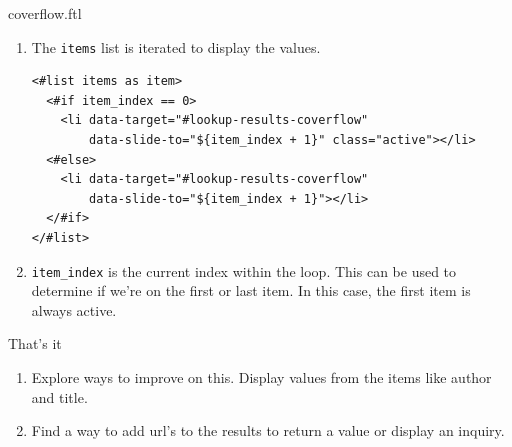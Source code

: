 \documentclass[xcolor=dvipsnames,14pt,professionalfonts]{beamer}
\begin{document}
 \begin{frame}[fragile]{coverflow.ftl}
  \begin{enumerate}
   \item The \texttt{items} list is iterated to display the values.
   \begin{verbatim}
<#list items as item>
  <#if item_index == 0>
    <li data-target="#lookup-results-coverflow" 
        data-slide-to="${item_index + 1}" class="active"></li>
  <#else>
    <li data-target="#lookup-results-coverflow" 
        data-slide-to="${item_index + 1}"></li>
  </#if>
</#list>
   \end{verbatim} 
   \item \texttt{item\_index} is the current index within the
     loop. This can be used to determine if we're on the first or last
     item. In this case, the first item is always active.
 \end{enumerate}
\end{frame}

\begin{frame}{That's it}
  \begin{enumerate}
    \item Explore ways to improve on this. Display values from the
      items like author and title.
    \item Find a way to add url's to the results to return a value or
      display an inquiry.
  \end{enumerate}
\end{frame}
\end{document}
